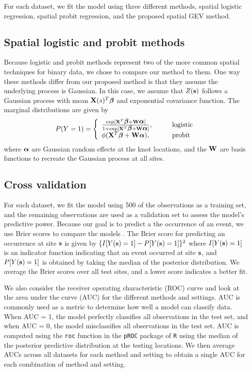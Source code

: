 For each dataset, we fit the model using three different methods, spatial logistic regression, spatial probit regression, and the proposed spatial GEV method.

\subsection{Spatial logistic and probit methods}
Because logistic and probit methods represent two of the more common spatial techniques for binary data, we chose to compare our method to them.
One way these methods differ from our proposed method is that they assume the underlying process is Gaussian.
In this case, we assume that $Z(\mathbf{s})$ follows a Gaussian process with mean $\mathbf{X}(s)^T \mbox{\boldmath $\beta$}$ and exponential covariance function.
The marginal distributions are given by
\begin{align}
  P(Y = 1) = \left\{ \begin{array}{ll}
    \frac{\exp[\mathbf{X}^T \mbox{\boldmath $\beta$} + \mathbf{W} \mbox{\boldmath $\alpha$}]}{1 + \exp[\mathbf{X}^T \mbox{\boldmath $\beta$} + \mathbf{W} \mbox{\boldmath $\alpha$}]}, \qquad &\text{logistic}\\
    \phi(\mathbf{X}^T \mbox{\boldmath $\beta$} + \mathbf{W} \mbox{\boldmath $\alpha$}), \qquad &\text{probit}
  \end{array}\right.
\end{align}
where $\mbox{\boldmath $\alpha$}$ are Gaussian random effects at the knot locations, and the $\mathbf{W}$ are basis functions to recreate the Gaussian process at all sites.

\subsection{Cross validation}\label{s:modelselect}
For each dataset, we fit the model using 500 of the observations as a training set, and the remaining observations are used as a validation set to assess the model's predictive power.
Because our goal is to predict a the occurrence of an event, we use Brier scores to compare the models \citep{Gneiting2007}.
The Brier score for predicting an occurrence at site $\mathbf{s}$ is given by $\{I[Y(\mathbf{s})=1] - P[Y(\mathbf{s})=1]\}^2$ where $I[Y(\mathbf{s}) = 1]$ is an indicator function indicating that an event occurred at site $\mathbf{s}$, and $P[Y(\mathbf{s}) = 1]$ is obtained by taking the median of the posterior distribution.
We average the Brier scores over all test sites, and a lower score indicates a better fit.

We also consider the receiver operating characteristic (ROC) curve and look at the area under the curve (AUC) for the different methods and settings.
AUC is commonly used as a metric to determine how well a model can classify data.
When AUC = 1, the model perfectly classifies all observations in the test set, and when AUC = 0, the model misclassifies all observations in the test set.
AUC is computed using the \texttt{roc} function in the \texttt{pROC} package of \texttt{R} using the median of the posterior predictive distribution at the testing locations.
We then average AUCs across all datasets for each method and setting to obtain a single AUC for each combination of method and setting.

